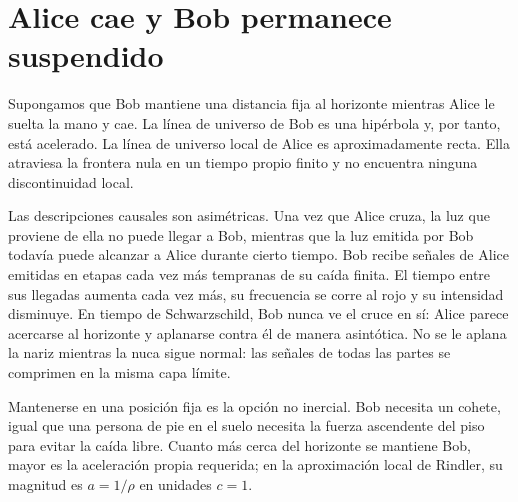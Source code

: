 \section{Alice cae y Bob permanece suspendido}

Supongamos que Bob mantiene una distancia fija al horizonte mientras Alice le suelta la mano y cae. La línea de universo de Bob es una hipérbola y, por tanto, está acelerado. La línea de universo local de Alice es aproximadamente recta. Ella atraviesa la frontera nula en un tiempo propio finito y no encuentra ninguna discontinuidad local.

Las descripciones causales son asimétricas. Una vez que Alice cruza, la luz que proviene de ella no puede llegar a Bob, mientras que la luz emitida por Bob todavía puede alcanzar a Alice durante cierto tiempo. Bob recibe señales de Alice emitidas en etapas cada vez más tempranas de su caída finita. El tiempo entre sus llegadas aumenta cada vez más, su frecuencia se corre al rojo y su intensidad disminuye. En tiempo de Schwarzschild, Bob nunca ve el cruce en sí: Alice parece acercarse al horizonte y aplanarse contra él de manera asintótica. No se le aplana la nariz mientras la nuca sigue normal: las señales de todas las partes se comprimen en la misma capa límite.

\begin{classroomqa}
\end{classroomqa}

\begin{classroomqa}
\end{classroomqa}

Mantenerse en una posición fija es la opción no inercial. Bob necesita un cohete, igual que una persona de pie en el suelo necesita la fuerza ascendente del piso para evitar la caída libre. Cuanto más cerca del horizonte se mantiene Bob, mayor es la aceleración propia requerida; en la aproximación local de Rindler, su magnitud es \(a=1/\rho\) en unidades \(c=1\).

